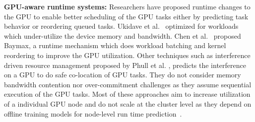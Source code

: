 \noindent\textbf{GPU-aware runtime systems:}
Researchers have proposed runtime changes to the GPU to enable better scheduling of the GPU tasks either by predicting task behavior or reordering queued tasks.
Ukidave et al.~\cite{ukidave2016mystic} optimized for workloads which under-utilize the device memory and bandwidth. 
Chen et al.~\cite{chen2016baymax} proposed Baymax, a runtime mechanism which does workload batching and kernel reordering to improve the GPU utilization.
Other techniques such as interference driven resource management proposed by Phull et al. \cite{Phull:2012:IRM:2287076.2287091}, predicts the interference on a GPU to do safe co-location of GPU tasks. They do not consider memory bandwidth contention nor over-commitment challenges as they assume sequential execution of the GPU tasks. 
Most of these approaches aim to increase utilization of a individual GPU node and do not scale at the cluster level as they depend on offline training models for node-level run time prediction~\cite{chen2016baymax,ukidave2016mystic}. 

